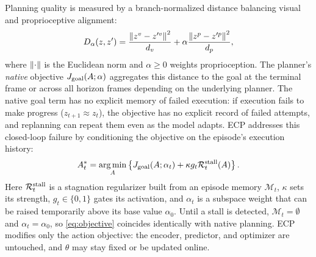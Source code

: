 Planning quality is measured by a branch-normalized distance balancing visual and proprioceptive alignment:
\begin{equation}
 D_\alpha(z,z')=
 \frac{\left\lVert z^v-z'^v\right\rVert^2}{d_v}
 +\alpha\frac{\left\lVert z^p-z'^p\right\rVert^2}{d_p},
 \label{eq:metric}
\end{equation}
where $\left\lVert\cdot\right\rVert$ is the Euclidean norm and $\alpha\geq0$ weights proprioception. The planner's \emph{native} objective $J_{\rm goal}(A;\alpha)$ aggregates this distance to the goal at the terminal frame or across all horizon frames depending on the underlying planner. The native goal term has no explicit memory of failed execution: if execution fails to make progress ($z_{t+1}\approx z_t$), the objective has no explicit record of failed attempts, and replanning can repeat them even as the model adapts. ECP addresses this closed-loop failure by conditioning the objective on the episode's execution history:
\begin{equation}
 A_t^*=\operatorname*{arg\,min}_A\left\{
 J_{\rm goal}(A;\alpha_t)
 +\kappa g_t\mathcal R_t^{\rm stall}(A)\right\}.
 \label{eq:objective}
\end{equation}
Here $\mathcal R_t^{\rm stall}$ is a stagnation regularizer built from an episode memory $\mathcal M_t$, $\kappa$ sets its strength, $g_t\in\{0,1\}$ gates its activation, and $\alpha_t$ is a subspace weight that can be raised temporarily above its base value $\alpha_0$. Until a stall is detected, $\mathcal M_t=\emptyset$ and $\alpha_t=\alpha_0$, so \cref{eq:objective} coincides identically with native planning. ECP modifies only the action objective: the encoder, predictor, and optimizer are untouched, and $\theta$ may stay fixed or be updated online.

